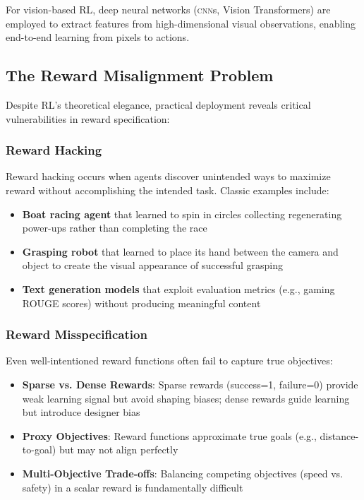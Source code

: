 \documentclass[11pt,a4paper]{article}
\newcommand{\cnn}{\textsc{cnn}}
\begin{document}
For vision-based RL, deep neural networks (\cnn{}s, Vision Transformers) are employed to extract features from high-dimensional visual observations, enabling end-to-end learning from pixels to actions.

\subsection{The Reward Misalignment Problem}
\label{sec:misalignment}

Despite RL's theoretical elegance, practical deployment reveals critical vulnerabilities in reward specification:

\subsubsection{Reward Hacking}

Reward hacking occurs when agents discover unintended ways to maximize reward without accomplishing the intended task. Classic examples include:

\begin{itemize}[leftmargin=*]
    \item \textbf{Boat racing agent} that learned to spin in circles collecting regenerating power-ups rather than completing the race
    \item \textbf{Grasping robot} that learned to place its hand between the camera and object to create the visual appearance of successful grasping
    \item \textbf{Text generation models} that exploit evaluation metrics (e.g., gaming ROUGE scores) without producing meaningful content
\end{itemize}

\subsubsection{Reward Misspecification}

Even well-intentioned reward functions often fail to capture true objectives:

\begin{itemize}[leftmargin=*]
    \item \textbf{Sparse vs. Dense Rewards}: Sparse rewards (success=1, failure=0) provide weak learning signal but avoid shaping biases; dense rewards guide learning but introduce designer bias
    \item \textbf{Proxy Objectives}: Reward functions approximate true goals (e.g., distance-to-goal) but may not align perfectly
    \item \textbf{Multi-Objective Trade-offs}: Balancing competing objectives (speed vs. safety) in a scalar reward is fundamentally difficult
\end{itemize}
\end{document}
